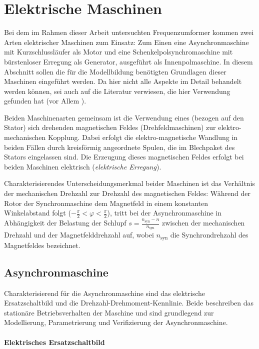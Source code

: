 \section{Elektrische Maschinen}
\label{sec:GrundlagenEMaschinen}
Bei dem im Rahmen dieser Arbeit untersuchten Frequenzumformer kommen zwei Arten elektrischer Maschinen zum Einsatz: Zum Einen eine Asynchronmaschine mit Kurzschlussläufer als Motor und eine Schenkelpolsynchromaschine mit bürstenloser Erregung als Generator, ausgeführt als Innenpolmaschine. In diesem Abschnitt sollen die für die Modellbildung benötigten Grundlagen dieser Maschinen eingeführt werden. Da hier nicht alle Aspekte im Detail behandelt werden können, sei auch auf die Literatur verwiesen, die hier Verwendung gefunden hat (vor Allem \cites{binderElektrischeMaschinenUnd2012,beckElektrischeEnergietechnikEinfuhrung2008,mullerGrundlagenElektrischerMaschinen2005}).

Beiden Maschinenarten gemeinsam ist die Verwendung eines (bezogen auf den Stator) sich drehenden magnetischen Feldes (Drehfeldmaschinen) zur elektro-mechanischen Kopplung. Dabei erfolgt die elektro-magnetische Wandlung in beiden Fällen durch kreisförmig angeordnete Spulen, die im Blechpaket des Stators eingelassen sind. Die Erzeugung dieses magnetischen Feldes erfolgt bei beiden Maschinen elektrisch (\emph{elektrische Erregung}).

Charakterisierendes Unterscheidungsmerkmal beider Maschinen ist das Verhältnis der mechanischen Drehzahl zur Drehzahl des magnetischen Feldes: Während der Rotor der Synchronmaschine dem Magnetfeld in einem konstanten Winkelabstand folgt (\(-\frac{\pi}{2} < \varphi < \frac{\pi}{2}\)), tritt bei der Asynchronmaschine in Abhängigkeit der Belastung der Schlupf \(s=\frac{n_{\mathrm{syn}} - n}{n_{\mathrm{syn}}}\) zwischen der mechanischen Drehzahl und der Magnetfelddrehzahl auf, wobei \(n_{\mathrm{syn}}\)  die Synchrondrehzahl des Magnetfeldes bezeichnet.

\subsection{Asynchronmaschine}
Charakterisierend für die Asynchronmaschine sind das elektrische Ersatzschaltbild und die Drehzahl-Drehmoment-Kennlinie. Beide beschreiben das stationäre Betriebsverhalten der Maschine und sind grundlegend zur Modellierung, Parametrierung und Verifizierung der Asynchronmaschine.

\paragraph{Elektrisches Ersatzschaltbild}

